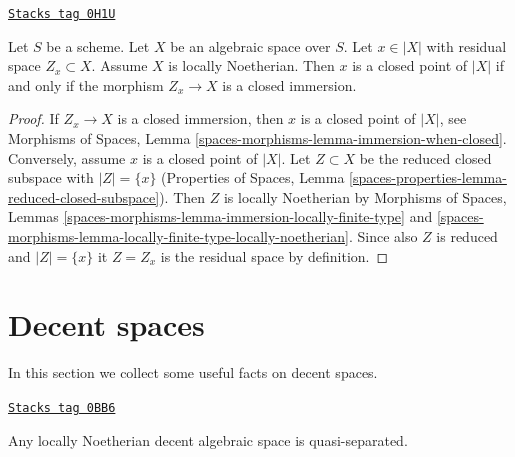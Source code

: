 \begin{lemma}
\label{decent-spaces-lemma-residual-space-closed}
\href{https://stacks.math.columbia.edu/tag/0H1U}{\texttt{Stacks tag 0H1U}}

Let $S$ be a scheme. Let $X$ be an algebraic space over $S$. Let $x \in |X|$
with residual space $Z_x \subset X$. Assume $X$ is locally Noetherian.
Then $x$ is a closed point of $|X|$ if and only if
the morphism $Z_x \to X$ is a closed immersion.
\end{lemma}

\begin{proof}
If $Z_x \to X$ is a closed immersion, then $x$ is a closed point of $|X|$, see
Morphisms of Spaces, Lemma \ref{spaces-morphisms-lemma-immersion-when-closed}.
Conversely, assume $x$ is a closed point of $|X|$.
Let $Z \subset X$ be the reduced closed subspace with $|Z| = \{x\}$
(Properties of Spaces,
Lemma \ref{spaces-properties-lemma-reduced-closed-subspace}).
Then $Z$ is locally Noetherian by Morphisms of Spaces, Lemmas
\ref{spaces-morphisms-lemma-immersion-locally-finite-type} and
\ref{spaces-morphisms-lemma-locally-finite-type-locally-noetherian}.
Since also $Z$ is reduced and $|Z| = \{x\}$ it $Z = Z_x$ is the
residual space by definition.
\end{proof}

\section{Decent spaces}
\label{decent-spaces-section-decent}
In this section we collect some useful facts on decent spaces.

\begin{lemma}
\label{decent-spaces-lemma-locally-Noetherian-decent-quasi-separated}
\href{https://stacks.math.columbia.edu/tag/0BB6}{\texttt{Stacks tag 0BB6}}

Any locally Noetherian decent algebraic space is quasi-separated.
\end{lemma}

